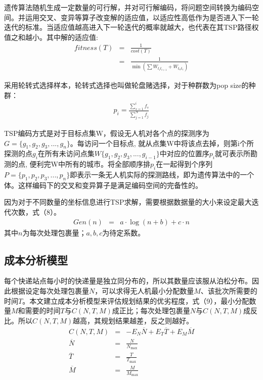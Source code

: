 \documentclass[twocolumn]{jbuaa}
\begin{document}
	遗传算法随机生成一定数量的可行解，并对可行解编码，将问题空间转换为编码空间。并运用交叉、变异等算子改变解的适应值，以适应性高低作为是否进入下一轮迭代的标准。当适应值越高进入下一轮迭代的概率就越大，也代表在其TSP路径权值之和越小。其中解的适应值:
	\begin{eqnarray}
		fitness\left( T\right) &=&\frac {1}{cost\left( T\right) }\\
		&=&\frac {1}{\min \left( \sum W_{t_{i}t_{i+1}}+W_{t_{n}t_{1}}\right) }
	\end{eqnarray}

	采用轮转式选择样本，轮转式选择也叫做轮盘赌选择，对于种群数为pop size的种群：
	\begin{eqnarray}
		p_{i}=\frac {\sum ^{i}_{s=1}f_{s}}{\sum ^{N}_{j=1}f_{j}}
	\end{eqnarray}

	TSP编码方式是对于目标点集W，假设无人机对各个点的探测序为$G=\{g_{1},g_{2},g_{3},...,g_{n}\}$。每访问一个目标点, 就从点集W中将该点去掉，则第i个所探测的点$g_{i}$在所有未访问点集$W\{g_{1},g_{2},g_{3},...,g_{i-1}\}$中对应的位置序$p_{i}$就可表示所勘测的点, 便利完W中所有的城市。将全部顺序排$p_{i}$在一起得到个序列$P=\{p_{1},p_{2},p_{3},...,p_{n}\}$即表示一条无人机实际的探测路线，即为遗传算法中的一个体。这样编码下的交叉和变异算子是满足编码空间的完备性的。

	因为对于不同数量的坐标信息进行TSP求解，需要根据数据量的大小来设定最大迭代次数，式（8）。
	\begin{eqnarray}
		Gen\left( n\right) &=&a\cdot \log \left( n+b\right) +c\cdot n
	\end{eqnarray}
	其中$n$为每次处理包裹量；$a,b,c$为待定系数。












	\subsection{成本分析模型}
	每个快递站点每小时的快递量是独立同分布的，所以其数量应该服从泊松分布。因此根据设定每次处理包裹量$N$，可以求得无人机最小分配数量$M$、该批次所需要的时间$T$。本文建立成本分析模型来评估规划结果的优劣程度，式（9），最小分配数量$M$和需要的时间$T$与$C(N,T,M)$成正比；每次处理包裹量$N$与$C(N,T,M)$成反比。所以$C(N,T,M)$越高，其规划结果越差，反之则越好。
	\begin{eqnarray}
		C\left( N,T,M\right) &=& -E_{N} \overline N +E_{T}  \overline T+E_{M}  \overline M \\
		\overline N &=& \frac {N}{N_{\max }}\\
		\overline T &=& \frac {T}{T_{\max }}\\
		\overline M &=& \frac {M}{M_{\max }}
	\end{eqnarray}
\end{document}
